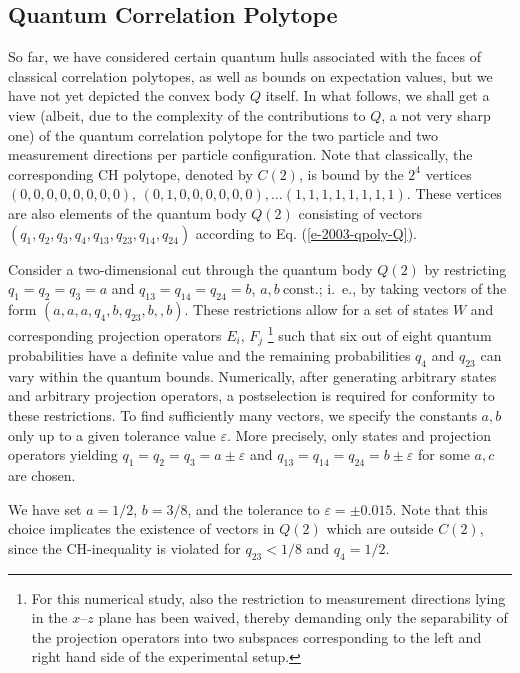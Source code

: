 \documentclass[pra,showpacs,showkeys,amsfonts]{revtex4}
\begin{document}
\subsection{Quantum Correlation Polytope}

So far, we have considered certain quantum hulls associated with
the faces of classical correlation polytopes, as well as bounds on expectation values,
but we have not yet  depicted
the convex body $Q$ itself.
In what follows, we shall get a view
(albeit, due to the complexity of the contributions to $Q$, a not very sharp one)
of the quantum correlation polytope
for the two particle and two measurement directions per particle configuration.
Note that classically,
the corresponding CH polytope, denoted by $C(2)$, is bound by the $2^4$ vertices
$
(0,0,0,0,0,0,0,0)
$,
$
(0,1,0,0,0,0,0,0),
\ldots
(1,1,1,1,1,1,1,1)
$.
These vertices are also elements of the quantum body $Q(2)$ consisting of vectors
$(q_{1},q_{2},q_3,q_4,q_{13},q_{23},q_{14},q_{24})$ according to
Eq. (\ref{e-2003-qpoly-Q}).

Consider a two-dimensional
cut through the quantum body $Q(2)$ by restricting
$q_{1}=q_{2}=q_{3}=a$ and $q_{13}=q_{14}=q_{24}=b$, $a,b\
\mbox{const.}$; i.~e., by taking vectors of the form
$(a,a,a,q_4,b,q_{23},b,,b)$.
These restrictions allow for a set of states
$W$
and corresponding projection operators $E_i,\,F_j$
\footnote{For this numerical study, also
  the restriction to measurement directions lying in the
  $x$--$z$ plane has been waived, thereby demanding only the separability of the
  projection operators into two subspaces corresponding to the left
  and right hand side of the experimental setup.}
such that six out of
eight quantum probabilities have a definite value and the remaining
probabilities $q_4$ and $q_{23}$ can vary within the quantum
bounds.
Numerically, after generating
arbitrary states and arbitrary projection operators,
a postselection is required for conformity to these restrictions.
To find sufficiently many vectors,
we specify the constants $a,b$ only up to a given tolerance value $\varepsilon$.
More precisely, only states and projection operators yielding
 $q_{1}=q_{2}=q_{3}=a\pm\varepsilon$ and
$q_{13}=q_{14}=q_{24}=b\pm\varepsilon$ for some $a,c$ are chosen.

We have set $a=1/2$, $b=3/8$, and the tolerance to $\varepsilon=\pm
0.015$.
Note that this choice implicates the existence of vectors in $Q(2)$ which are
outside $C(2)$, since the CH-inequality
is violated for $q_{23}<1/8$ and $q_4=1/2$.
\end{document}
